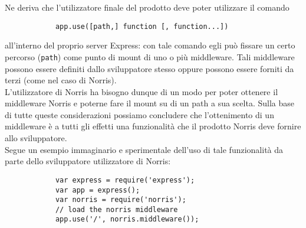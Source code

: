 		Ne deriva che l'utilizzatore finale del prodotto deve poter utilizzare il comando
		\begin{lstlisting}
			app.use([path,] function [, function...])
		\end{lstlisting}
		all'interno del proprio server Express: con tale comando egli può fissare un certo percorso (\texttt{path}) come punto di mount di uno o più middleware. Tali middleware possono essere definiti dallo sviluppatore stesso oppure possono essere forniti da terzi (come nel caso di Norris).\\
		L'utilizzatore di Norris ha bisogno dunque di un modo per poter ottenere il middleware Norris e poterne fare il mount su di un path a sua scelta. Sulla base di tutte queste considerazioni possiamo concludere che l'ottenimento di un middleware è a tutti gli effetti una funzionalità che il prodotto Norris deve fornire allo sviluppatore.\\
		Segue un esempio immaginario e sperimentale dell'uso di tale funzionalità da parte dello sviluppatore utilizzatore di Norris:
		\begin{lstlisting}
			var express = require('express');
			var app = express();
			var norris = require('norris');
			// load the norris middleware
			app.use('/', norris.middleware());
		\end{lstlisting}